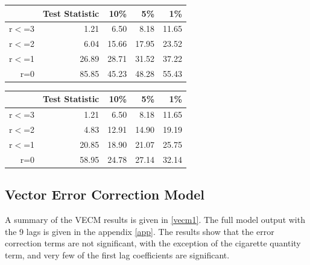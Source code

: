 \documentclass[11pt,preprint, authoryear]{elsarticle}
\let\origtable\table
\let\endorigtable\endtable
\renewenvironment{table}[1][2] {
    \expandafter\origtable\expandafter[H]
} {
    \endorigtable
}
\numberwithin{equation}{section}
\numberwithin{figure}{section}
\numberwithin{table}{section}
\begin{document}
\begin{table}[H]
\centering
\begin{tabular}{rrrrr}
  \hline
 & Test Statistic & 10\% & 5\% & 1\% \\ 
  \hline
r$<$=3 & 1.21 & 6.50 & 8.18 & 11.65 \\ 
  r$<$=2 & 6.04 & 15.66 & 17.95 & 23.52 \\ 
  r$<$=1 & 26.89 & 28.71 & 31.52 & 37.22 \\ 
  r=0 & 85.85 & 45.23 & 48.28 & 55.43 \\ 
   \hline
\end{tabular}
\caption{Johansen Trace Test for Cointegration Results\label{coint}} 
\end{table}
\begin{table}[H]
\centering
\begin{tabular}{rrrrr}
  \hline
 & Test Statistic & 10\% & 5\% & 1\% \\ 
  \hline
r$<$=3 & 1.21 & 6.50 & 8.18 & 11.65 \\ 
  r$<$=2 & 4.83 & 12.91 & 14.90 & 19.19 \\ 
  r$<$=1 & 20.85 & 18.90 & 21.07 & 25.75 \\ 
  r=0 & 58.95 & 24.78 & 27.14 & 32.14 \\ 
   \hline
\end{tabular}
\caption{Johansen Eigenvalue Test for Cointegration Results\label{eigen}} 
\end{table}

\hypertarget{vector-error-correction-model}{%
\subsection{Vector Error Correction
Model}\label{vector-error-correction-model}}

A summary of the VECM results is given in \ref{vecm1}. The full model
output with the 9 lags is given in the appendix \ref{app}. The results
show that the error correction terms are not significant, with the
exception of the cigarette quantity term, and very few of the first lag
coefficients are significant.
\end{document}
